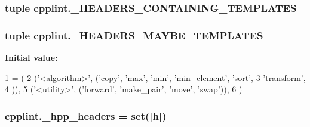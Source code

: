 \subsubsection[{\texorpdfstring{\+\_\+\+H\+E\+A\+D\+E\+R\+S\+\_\+\+C\+O\+N\+T\+A\+I\+N\+I\+N\+G\+\_\+\+T\+E\+M\+P\+L\+A\+T\+ES}{_HEADERS_CONTAINING_TEMPLATES}}]{\setlength{\rightskip}{0pt plus 5cm}tuple cpplint.\+\_\+\+H\+E\+A\+D\+E\+R\+S\+\_\+\+C\+O\+N\+T\+A\+I\+N\+I\+N\+G\+\_\+\+T\+E\+M\+P\+L\+A\+T\+ES\hspace{0.3cm}{\ttfamily [private]}}\hypertarget{namespacecpplint_a1741ee2a4dc3f33620d655f246b5162f}{}\label{namespacecpplint_a1741ee2a4dc3f33620d655f246b5162f}
\subsubsection[{\texorpdfstring{\+\_\+\+H\+E\+A\+D\+E\+R\+S\+\_\+\+M\+A\+Y\+B\+E\+\_\+\+T\+E\+M\+P\+L\+A\+T\+ES}{_HEADERS_MAYBE_TEMPLATES}}]{\setlength{\rightskip}{0pt plus 5cm}tuple cpplint.\+\_\+\+H\+E\+A\+D\+E\+R\+S\+\_\+\+M\+A\+Y\+B\+E\+\_\+\+T\+E\+M\+P\+L\+A\+T\+ES\hspace{0.3cm}{\ttfamily [private]}}\hypertarget{namespacecpplint_a0cfde54f6a4bc9c9e2e16019146e2167}{}\label{namespacecpplint_a0cfde54f6a4bc9c9e2e16019146e2167}
{\bfseries Initial value\+:}
\begin{DoxyCode}
1 = (
2     (\textcolor{stringliteral}{'<algorithm>'}, (\textcolor{stringliteral}{'copy'}, \textcolor{stringliteral}{'max'}, \textcolor{stringliteral}{'min'}, \textcolor{stringliteral}{'min\_element'}, \textcolor{stringliteral}{'sort'},
3                      \textcolor{stringliteral}{'transform'},
4                     )),
5     (\textcolor{stringliteral}{'<utility>'}, (\textcolor{stringliteral}{'forward'}, \textcolor{stringliteral}{'make\_pair'}, \textcolor{stringliteral}{'move'}, \textcolor{stringliteral}{'swap'})),
6     )
\end{DoxyCode}
\subsubsection[{\texorpdfstring{\+\_\+hpp\+\_\+headers}{_hpp_headers}}]{\setlength{\rightskip}{0pt plus 5cm}cpplint.\+\_\+hpp\+\_\+headers = set(\mbox{[}\textquotesingle{}h\textquotesingle{}\mbox{]})\hspace{0.3cm}{\ttfamily [private]}}\hypertarget{namespacecpplint_aa6c6e506c79bdba0431362eca044f02f}{}\label{namespacecpplint_aa6c6e506c79bdba0431362eca044f02f}
